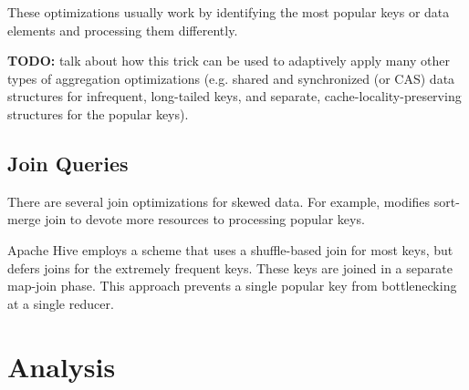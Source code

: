 \documentclass[12pt]{article}
\begin{document}
These optimizations usually work by identifying the most popular keys or data
elements and processing them differently.

\textbf{TODO:} talk about how this trick can be used to adaptively apply many
other types of aggregation optimizations (e.g. shared and synchronized (or
CAS) data structures for infrequent, long-tailed keys, and separate,
cache-locality-preserving structures for the popular keys).



\subsection{Join Queries}

There are several join optimizations for skewed data.  For example,
\cite{smj-skew-optmization} modifies sort-merge join to devote more resources
to processing popular keys.

Apache Hive \cite{hive-join-strategies} employs a scheme that uses
a shuffle-based join for most keys, but defers joins for the extremely
frequent keys.  These keys are joined in a separate map-join phase.  This
approach prevents a single popular key from bottlenecking at a single reducer.



\pagebreak
\section{Analysis}
\end{document}
